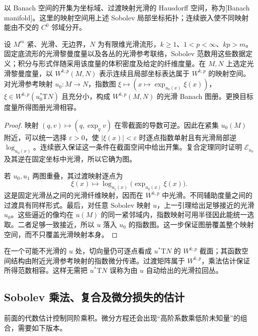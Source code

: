 以 Banach 空间的开集为坐标域、过渡映射光滑的 Hausdorff 空间，称为[Banach manifold]。这里的映射空间用上述 Sobolev 局部坐标拓扑；连续嵌入使不同映射能由不交的 \(C^0\) 邻域分开。

\begin{theorem}\label{g3:thm:sobolev-map-charts}
	设 \(M^m\) 紧、光滑、无边界，\(N\) 为有限维光滑流形，\(k\ge1\)、\(1<p<\infty\)、\(kp>m\)。固定底流形的光滑黎曼度量以及各丛的光滑参考联络，Sobolev 范数用这些数据定义；积分与形式伴随采用该度量的体积密度及给定的纤维度量。在 \(M,N\) 上选定光滑黎曼度量，以 \(W^{k,p}(M,N)\) 表示连续且局部坐标表达属于 \(W^{k,p}\) 的映射空间。对光滑参考映射 \(u_0:M\to N\)，指数图 \(\xi\mapsto(x\mapsto\exp_{u_0(x)}\xi(x))\)，\(\xi\in W^{k,p}(u_0^*\mathrm TN)\) 且充分小，构成 \(W^{k,p}(M,N)\) 的光滑 Banach 图册。更换目标度量所得图册光滑相容。
\end{theorem}
\begin{proof}
	映射 \((q,v)\mapsto(q,\exp_qv)\) 在零截面的导数可逆。因此在紧集 \(u_0(M)\) 附近，可以统一选择 \(\varepsilon>0\)，使 \(|\xi(x)|<\varepsilon\) 时逐点指数单射且有光滑局部逆 \(\log_{u_0(x)}\)。连续嵌入保证这一条件在截面空间中给出开集。复合定理同时证明 \(\mathcal E_{u_0}\) 及其逆在固定坐标中光滑，所以它确为图。

	若 \(u_0,u_1\) 两图重叠，其过渡映射逐点为
	\[
		\xi(x)\longmapsto
		\log_{u_1(x)}\bigl(\exp_{u_0(x)}\xi(x)\bigr).
	\]
	这是固定光滑丛之间的光滑纤维映射，因而在 \(W^{k,p}\) 中光滑。不同辅助度量之间的过渡具有同样形式。最后，对任意 Sobolev 映射 \(u\)，上一引理给出足够接近的光滑 \(u_0\)。这些逼近的像均在 \(u(M)\) 的同一紧邻域内，指数映射可用半径因此能统一选取。二者足够一致接近，所以 \(u\) 落入 \(u_0\) 的指数图。这一步保证图册覆盖整个映射空间，而不只覆盖光滑映射本身。
\end{proof}

在一个可能不光滑的 \(u\) 处，切向量仍可逐点看成 \(u^*\mathrm TN\) 的 \(W^{k,p}\) 截面；其函数空间结构由附近光滑参考映射的指数微分传递。过渡矩阵属于 \(W^{k,p}\)，乘法估计保证所得范数相容。这样无需把 \(u^*\mathrm TN\) 误称为由 \(u\) 自动给出的光滑拉回丛。

\subsection{Sobolev 乘法、复合及微分损失的估计}
\label{g3:subsec:1306:03}
前面的代数估计控制同阶乘积。微分方程还会出现“高阶系数乘低阶未知量”的组合，需要如下版本。


